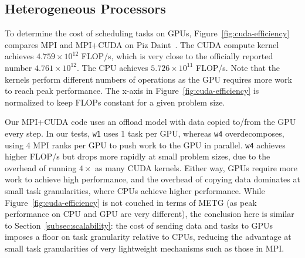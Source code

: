 \subsection{\vspace{-0.10cm}Heterogeneous Processors}



To determine the cost of scheduling tasks on GPUs, Figure~\ref{fig:cuda-efficiency} compares MPI
and MPI+CUDA on Piz Daint~\cite{PizDaint}. The CUDA
compute kernel achieves $4.759 \times 10^{12}$
FLOP/s, which is very close to the officially reported number
$4.761 \times 10^{12}$. The CPU achieves $5.726 \times 10^{11}$
FLOP/s. Note that the kernels perform different numbers of
operations as the GPU requires more work to reach peak
performance. The x-axis in Figure~\ref{fig:cuda-efficiency} is
normalized to keep FLOPs constant for a given problem
size.

Our MPI+CUDA code uses an offload model with data copied to/from the GPU every step. In our tests, \lstinline{w1} uses 1 task per GPU, whereas
\lstinline{w4} overdecomposes, using 4 MPI
ranks per GPU to push work to the GPU in parallel.
\lstinline{w4} achieves higher FLOP/s but
drops more rapidly at small problem sizes, due to the overhead of
running $4\times$ as many CUDA kernels. Either way,
GPUs require more work to achieve high performance, and the overhead
of copying data dominates at small task
granularities, where CPUs achieve higher
performance. While Figure~\ref{fig:cuda-efficiency} is not couched in
terms of METG (as peak performance on CPU and GPU are very
different), the conclusion here is similar to
Section~\ref{subsec:scalability}: the cost of sending data and
tasks to GPUs imposes a floor on task granularity relative to CPUs, reducing the advantage at small task granularities of
very lightweight mechanisms such as those in MPI.




